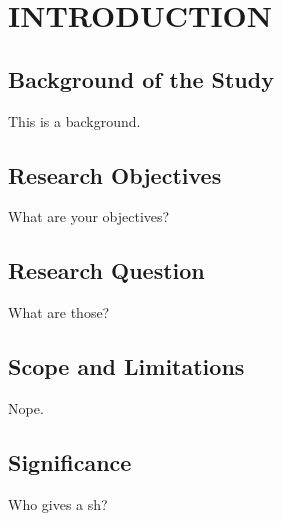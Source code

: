 \chapter{INTRODUCTION}

\section{Background of the Study}
This is a background.

\section{Research Objectives}
What are your objectives?

\section{Research Question}
What are those?

\section{Scope and Limitations}
Nope.

\section{Significance}
Who gives a sh?
